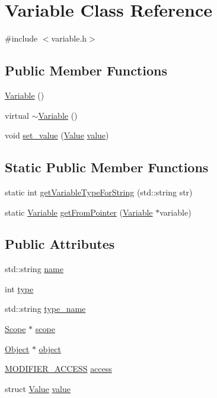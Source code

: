 \hypertarget{classVariable}{}\section{Variable Class Reference}
\label{classVariable}


{\ttfamily \#include $<$variable.\+h$>$}

\subsection*{Public Member Functions}
\begin{DoxyCompactItemize}
\item 
\hyperlink{classVariable_a5716c9dcafcc8cf59a6f6b5dac3ec7a2}{Variable} ()
\item 
virtual \hyperlink{classVariable_abeaf0f45e2b8d0b063b567d6491604fd}{$\sim$\+Variable} ()
\item 
void \hyperlink{classVariable_af4e546850a78ab022d111a2d1af5b74d}{set\+\_\+value} (\hyperlink{classValue}{Value} \hyperlink{classVariable_a94151da0f0a411749f84aaf65a9c7045}{value})
\end{DoxyCompactItemize}
\subsection*{Static Public Member Functions}
\begin{DoxyCompactItemize}
\item 
static int \hyperlink{classVariable_aa0be16097cea78860a025aeaac8f6d2e}{get\+Variable\+Type\+For\+String} (std\+::string str)
\item 
static \hyperlink{classVariable}{Variable} \hyperlink{classVariable_a9082f1e84cdaac510ddba4d491d990e0}{get\+From\+Pointer} (\hyperlink{classVariable}{Variable} $\ast$variable)
\end{DoxyCompactItemize}
\subsection*{Public Attributes}
\begin{DoxyCompactItemize}
\item 
std\+::string \hyperlink{classVariable_aaf7205662069a5f8f673c158cb31f418}{name}
\item 
int \hyperlink{classVariable_a659e966bd442dbde52df805e15005bf9}{type}
\item 
std\+::string \hyperlink{classVariable_ac237e4099c004a617ad8bd2effbfafb2}{type\+\_\+name}
\item 
\hyperlink{classScope}{Scope} $\ast$ \hyperlink{classVariable_a1d7f7a674747e42e4ecc5267252c12d4}{scope}
\item 
\hyperlink{classObject}{Object} $\ast$ \hyperlink{classVariable_aea57391bcc48e74c9d8cae131612ff0b}{object}
\item 
\hyperlink{statics_8h_a0cbe4939ec6da73b52afbebd794d60ba}{M\+O\+D\+I\+F\+I\+E\+R\+\_\+\+A\+C\+C\+E\+SS} \hyperlink{classVariable_a20553c67076b2c5a27cc0d35b4cc65b3}{access}
\item 
struct \hyperlink{classValue}{Value} \hyperlink{classVariable_a94151da0f0a411749f84aaf65a9c7045}{value}
\end{DoxyCompactItemize}


